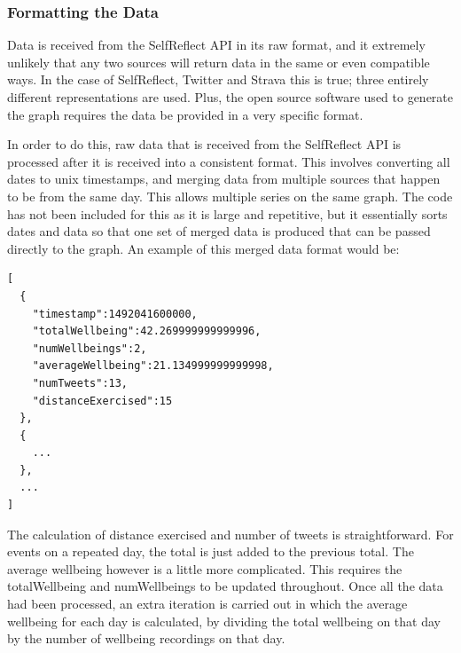 \documentclass[11pt,openright,a4paper]{report}
\begin{document}
\subsubsection{Formatting the Data}
Data is received from the SelfReflect API in its raw format, and it extremely unlikely that any two sources will return data in the same or even compatible ways. In the case of SelfReflect, Twitter and Strava this is true; three entirely different representations are used. Plus, the open source software used to generate the graph requires the data be provided in a very specific format.

In order to do this, raw data that is received from the SelfReflect API is processed after it is received into a consistent format. This involves converting all dates to unix timestamps, and merging data from multiple sources that happen to be from the same day. This allows multiple series on the same graph. The code has not been included for this as it is large and repetitive, but it essentially sorts dates and data so that one set of merged data is produced that can be passed directly to the graph. An example of this merged data format would be:
\begin{lstlisting}
[
  {
    "timestamp":1492041600000,
    "totalWellbeing":42.269999999999996,
    "numWellbeings":2,
    "averageWellbeing":21.134999999999998,
    "numTweets":13,
    "distanceExercised":15
  },
  {
    ...
  },
  ...
]
\end{lstlisting}
The calculation of distance exercised and number of tweets is straightforward. For events on a repeated day, the total is just added to the previous total. The average wellbeing however is a little more complicated. This requires the totalWellbeing and numWellbeings to be updated throughout. Once all the data had been processed, an extra iteration is carried out in which the average wellbeing for each day is calculated, by dividing the total wellbeing on that day by the number of wellbeing recordings on that day.
\end{document}
